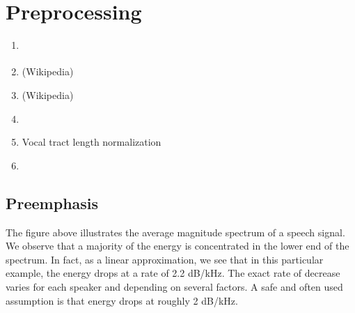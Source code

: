 \documentclass[letterpaper,10pt,english]{jupyterBook}
\begin{document}
\sphinxstepscope


\chapter{Pre\sphinxhyphen{}processing}
\label{\detokenize{Pre-processing:pre-processing}}\label{\detokenize{Pre-processing::doc}}\begin{enumerate}
%
\item {} 
\sphinxAtStartPar
{\hyperref[\detokenize{Preprocessing/Pre-emphasis::doc}]{}}

\item {} 
\sphinxAtStartPar
{} (Wikipedia)

\item {} 
\sphinxAtStartPar
{} (Wikipedia)

\item {} 
\sphinxAtStartPar
{}

\item {} 
\sphinxAtStartPar
Vocal tract length normalization

\item {} 
\sphinxAtStartPar
{\hyperref[\detokenize{Speech_enhancement::doc}]{}}

\end{enumerate}

\sphinxstepscope


\section{Pre\sphinxhyphen{}emphasis}
\label{\detokenize{Preprocessing/Pre-emphasis:pre-emphasis}}\label{\detokenize{Preprocessing/Pre-emphasis::doc}}
\sphinxAtStartPar
{}

\sphinxAtStartPar
The figure above illustrates the average magnitude spectrum of a
speech signal. We observe that a majority of the energy is concentrated
in the lower end of the spectrum. In fact, as a linear approximation, we
see that in this particular example, the energy drops at a rate of 2.2
dB/kHz. The exact rate of decrease varies for each speaker and depending
on several factors. A safe and often used assumption is that energy
drops at roughly 2 dB/kHz.
\end{document}
